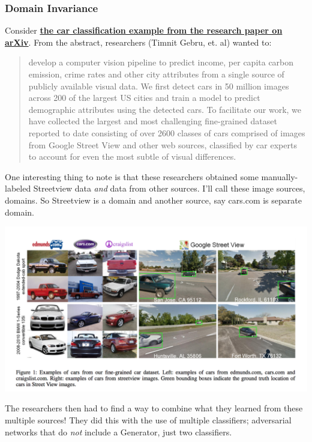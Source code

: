 \subsubsection{Domain Invariance}
Consider \href{https://arxiv.org/abs/1709.02480}{\textbf{the car classification example from the research paper on arXiv}}. From the abstract, researchers (Timnit Gebru, et. al) wanted to:

\begin{quote}
develop a computer vision pipeline to predict income, per capita carbon emission, crime rates and other city attributes from a single source of publicly available visual data. We first detect cars in 50 million images across 200 of the largest US cities and train a model to predict demographic attributes using the detected cars. To facilitate our work, we have collected the largest and most challenging fine-grained dataset reported to date consisting of over 2600 classes of cars comprised of images from Google Street View and other web sources, classified by car experts to account for even the most subtle of visual differences.

\end{quote}

One interesting thing to note is that these researchers obtained some manually-labeled Streetview data \textit{and} data from other sources. I'll call these image sources, domains. So Streetview is a domain and another source, say cars.com is separate domain.

\includegraphics[width=1\linewidth]{img//genAdvNet//deepGAN/screen-shot-2018-11-13-at-3.06.36-pm.png}

The researchers then had to find a way to combine what they learned from these multiple sources! They did this with the use of multiple classifiers; adversarial networks that do \textit{not} include a Generator, just two classifiers.


